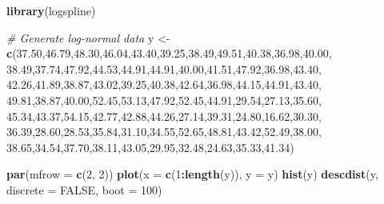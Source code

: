 \documentclass[english,10pt,a4paper,oneside]{book}
\newenvironment{Shaded}{\begin{snugshade}}{\end{snugshade}}
\newcommand{\KeywordTok}[1]{\textcolor[rgb]{0.13,0.29,0.53}{\textbf{#1}}}
\newcommand{\DataTypeTok}[1]{\textcolor[rgb]{0.13,0.29,0.53}{#1}}
\newcommand{\DecValTok}[1]{\textcolor[rgb]{0.00,0.00,0.81}{#1}}
\newcommand{\FloatTok}[1]{\textcolor[rgb]{0.00,0.00,0.81}{#1}}
\newcommand{\StringTok}[1]{\textcolor[rgb]{0.31,0.60,0.02}{#1}}
\newcommand{\CommentTok}[1]{\textcolor[rgb]{0.56,0.35,0.01}{\textit{#1}}}
\newcommand{\OtherTok}[1]{\textcolor[rgb]{0.56,0.35,0.01}{#1}}
\newcommand{\OperatorTok}[1]{\textcolor[rgb]{0.81,0.36,0.00}{\textbf{#1}}}
\newcommand{\NormalTok}[1]{#1}
\theoremstyle{definition}
\theoremstyle{definition}
\theoremstyle{definition}
\theoremstyle{remark}
\begin{document}
\begin{Shaded}
\begin{Highlighting}[]
\KeywordTok{library}\NormalTok{(logspline)}

\CommentTok{# Generate log-normal data}
\NormalTok{y <-}\StringTok{ }\KeywordTok{c}\NormalTok{(}\FloatTok{37.50}\NormalTok{,}\FloatTok{46.79}\NormalTok{,}\FloatTok{48.30}\NormalTok{,}\FloatTok{46.04}\NormalTok{,}\FloatTok{43.40}\NormalTok{,}\FloatTok{39.25}\NormalTok{,}\FloatTok{38.49}\NormalTok{,}\FloatTok{49.51}\NormalTok{,}\FloatTok{40.38}\NormalTok{,}\FloatTok{36.98}\NormalTok{,}\FloatTok{40.00}\NormalTok{,}
\FloatTok{38.49}\NormalTok{,}\FloatTok{37.74}\NormalTok{,}\FloatTok{47.92}\NormalTok{,}\FloatTok{44.53}\NormalTok{,}\FloatTok{44.91}\NormalTok{,}\FloatTok{44.91}\NormalTok{,}\FloatTok{40.00}\NormalTok{,}\FloatTok{41.51}\NormalTok{,}\FloatTok{47.92}\NormalTok{,}\FloatTok{36.98}\NormalTok{,}\FloatTok{43.40}\NormalTok{,}
\FloatTok{42.26}\NormalTok{,}\FloatTok{41.89}\NormalTok{,}\FloatTok{38.87}\NormalTok{,}\FloatTok{43.02}\NormalTok{,}\FloatTok{39.25}\NormalTok{,}\FloatTok{40.38}\NormalTok{,}\FloatTok{42.64}\NormalTok{,}\FloatTok{36.98}\NormalTok{,}\FloatTok{44.15}\NormalTok{,}\FloatTok{44.91}\NormalTok{,}\FloatTok{43.40}\NormalTok{,}
\FloatTok{49.81}\NormalTok{,}\FloatTok{38.87}\NormalTok{,}\FloatTok{40.00}\NormalTok{,}\FloatTok{52.45}\NormalTok{,}\FloatTok{53.13}\NormalTok{,}\FloatTok{47.92}\NormalTok{,}\FloatTok{52.45}\NormalTok{,}\FloatTok{44.91}\NormalTok{,}\FloatTok{29.54}\NormalTok{,}\FloatTok{27.13}\NormalTok{,}\FloatTok{35.60}\NormalTok{,}
\FloatTok{45.34}\NormalTok{,}\FloatTok{43.37}\NormalTok{,}\FloatTok{54.15}\NormalTok{,}\FloatTok{42.77}\NormalTok{,}\FloatTok{42.88}\NormalTok{,}\FloatTok{44.26}\NormalTok{,}\FloatTok{27.14}\NormalTok{,}\FloatTok{39.31}\NormalTok{,}\FloatTok{24.80}\NormalTok{,}\FloatTok{16.62}\NormalTok{,}\FloatTok{30.30}\NormalTok{,}
\FloatTok{36.39}\NormalTok{,}\FloatTok{28.60}\NormalTok{,}\FloatTok{28.53}\NormalTok{,}\FloatTok{35.84}\NormalTok{,}\FloatTok{31.10}\NormalTok{,}\FloatTok{34.55}\NormalTok{,}\FloatTok{52.65}\NormalTok{,}\FloatTok{48.81}\NormalTok{,}\FloatTok{43.42}\NormalTok{,}\FloatTok{52.49}\NormalTok{,}\FloatTok{38.00}\NormalTok{,}
\FloatTok{38.65}\NormalTok{,}\FloatTok{34.54}\NormalTok{,}\FloatTok{37.70}\NormalTok{,}\FloatTok{38.11}\NormalTok{,}\FloatTok{43.05}\NormalTok{,}\FloatTok{29.95}\NormalTok{,}\FloatTok{32.48}\NormalTok{,}\FloatTok{24.63}\NormalTok{,}\FloatTok{35.33}\NormalTok{,}\FloatTok{41.34}\NormalTok{)}

\KeywordTok{par}\NormalTok{(}\DataTypeTok{mfrow =} \KeywordTok{c}\NormalTok{(}\DecValTok{2}\NormalTok{, }\DecValTok{2}\NormalTok{))}
\KeywordTok{plot}\NormalTok{(}\DataTypeTok{x =} \KeywordTok{c}\NormalTok{(}\DecValTok{1}\OperatorTok{:}\KeywordTok{length}\NormalTok{(y)), }\DataTypeTok{y =}\NormalTok{ y)}
\KeywordTok{hist}\NormalTok{(y)}
\KeywordTok{descdist}\NormalTok{(y, }\DataTypeTok{discrete =} \OtherTok{FALSE}\NormalTok{, }\DataTypeTok{boot =} \DecValTok{100}\NormalTok{)}
\end{Highlighting}
\end{Shaded}
\end{document}
